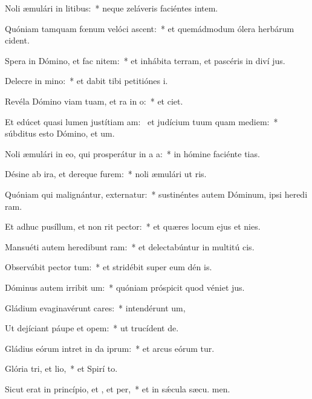 \item Noli æmulári in litibus:~* neque zeláveris faciéntes intem.
\item Quóniam tamquam fœnum velóci ascent:~* et quemádmodum ólera herbárum  cident.
\item Spera in Dómino, et fac nitem:~* et inhábita terram, et pascéris in diví jus.
\item Delecre in mino:~* et dabit tibi petitiónes  i.
\item Revéla Dómino viam tuam, et ra in o:~* et  ciet.
\item Et edúcet quasi lumen justítiam am:~\pscross{} et judícium tuum quam mediem:~* súbditus esto Dómino, et  um.
\item Noli æmulári in eo, qui prosperátur in a a:~* in hómine faciénte tias.
\item Désine ab ira, et dereque furem:~* noli æmulári ut ris.
\item Quóniam qui malignántur, externatur:~* sustinéntes autem Dóminum, ipsi heredi ram.
\item Et adhuc pusíllum, et non rit pector:~* et quæres locum ejus et  nies.
\item Mansuéti autem heredibunt ram:~* et delectabúntur in multitú cis.
\item Observábit pector tum:~* et stridébit super eum dén is.
\item Dóminus autem irribit um:~* quóniam próspicit quod véniet  jus.
\item Gládium evaginavérunt cares:~* intendérunt  um,
\item Ut dejíciant páupe et opem:~* ut trucídent  de.
\item Gládius eórum intret in da iprum:~* et arcus eórum tur.
\item Glória tri, et lio,~* et Spirí to.
\item Sicut erat in princípio, et , et per,~* et in sǽcula sæcu. men.
